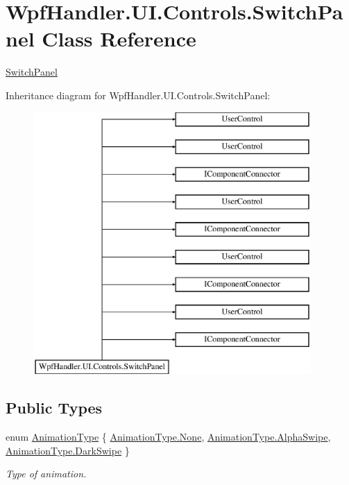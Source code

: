 \hypertarget{class_wpf_handler_1_1_u_i_1_1_controls_1_1_switch_panel}{}\section{Wpf\+Handler.\+U\+I.\+Controls.\+Switch\+Panel Class Reference}
\label{class_wpf_handler_1_1_u_i_1_1_controls_1_1_switch_panel}


\mbox{\hyperlink{class_wpf_handler_1_1_u_i_1_1_controls_1_1_switch_panel}{Switch\+Panel}}  


Inheritance diagram for Wpf\+Handler.\+U\+I.\+Controls.\+Switch\+Panel\+:\begin{figure}[H]
\begin{center}
\leavevmode
\includegraphics[height=10.000000cm]{de/d1c/class_wpf_handler_1_1_u_i_1_1_controls_1_1_switch_panel}
\end{center}
\end{figure}
\subsection*{Public Types}
\begin{DoxyCompactItemize}
\item 
enum \mbox{\hyperlink{class_wpf_handler_1_1_u_i_1_1_controls_1_1_switch_panel_aad6e1d850ec0101cc8d98c259971e272}{Animation\+Type}} \{ \mbox{\hyperlink{class_wpf_handler_1_1_u_i_1_1_controls_1_1_switch_panel_aad6e1d850ec0101cc8d98c259971e272a6adf97f83acf6453d4a6a4b1070f3754}{Animation\+Type.\+None}}, 
\mbox{\hyperlink{class_wpf_handler_1_1_u_i_1_1_controls_1_1_switch_panel_aad6e1d850ec0101cc8d98c259971e272a4ce5d668b86ac96aacf1d05114485003}{Animation\+Type.\+Alpha\+Swipe}}, 
\mbox{\hyperlink{class_wpf_handler_1_1_u_i_1_1_controls_1_1_switch_panel_aad6e1d850ec0101cc8d98c259971e272aa6f170ca3522b9caecbc14df26a22710}{Animation\+Type.\+Dark\+Swipe}}
 \}
\begin{DoxyCompactList}\small\item\em Type of animation. \end{DoxyCompactList}\end{DoxyCompactItemize}
